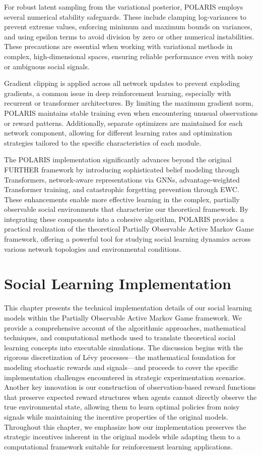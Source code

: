 For robust latent sampling from the variational posterior, POLARIS employs several numerical stability safeguards. These include clamping log-variances to prevent extreme values, enforcing minimum and maximum bounds on variances, and using epsilon terms to avoid division by zero or other numerical instabilities. These precautions are essential when working with variational methods in complex, high-dimensional spaces, ensuring reliable performance even with noisy or ambiguous social signals.

Gradient clipping is applied across all network updates to prevent exploding gradients, a common issue in deep reinforcement learning, especially with recurrent or transformer architectures. By limiting the maximum gradient norm, POLARIS maintains stable training even when encountering unusual observations or reward patterns. Additionally, separate optimizers are maintained for each network component, allowing for different learning rates and optimization strategies tailored to the specific characteristics of each module.

The POLARIS implementation significantly advances beyond the original FURTHER framework by introducing sophisticated belief modeling through Transformers, network-aware representations via GNNs, advantage-weighted Transformer training, and catastrophic forgetting prevention through EWC. These enhancements enable more effective learning in the complex, partially observable social environments that characterize our theoretical framework. By integrating these components into a cohesive algorithm, POLARIS provides a practical realization of the theoretical Partially Observable Active Markov Game framework, offering a powerful tool for studying social learning dynamics across various network topologies and environmental conditions.

\chapter{Social Learning Implementation}

This chapter presents the technical implementation details of our social learning models within the Partially Observable Active Markov Game framework. We provide a comprehensive account of the algorithmic approaches, mathematical techniques, and computational methods used to translate theoretical social learning concepts into executable simulations. The discussion begins with the rigorous discretization of Lévy processes—the mathematical foundation for modeling stochastic rewards and signals—and proceeds to cover the specific implementation challenges encountered in strategic experimentation scenarios. Another key innovation is our construction of observation-based reward functions that preserve expected reward structures when agents cannot directly observe the true environmental state, allowing them to learn optimal policies from noisy signals while maintaining the incentive properties of the original models. Throughout this chapter, we emphasize how our implementation preserves the strategic incentives inherent in the original models while adapting them to a computational framework suitable for reinforcement learning applications.

